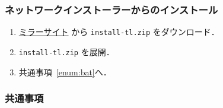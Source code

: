 \subsubsection*{ネットワークインストーラーからのインストール}

\begin{enumerate}
    \item \href{http://mirror.ctan.org/systems/texlive/tlnet/}{ミラーサイト} から \verb|install-tl.zip| をダウンロード．
    \item \verb|install-tl.zip| を展開．
    \item 共通事項~\ref{enum:bat}へ．
\end{enumerate}

\subsubsection*{共通事項}

